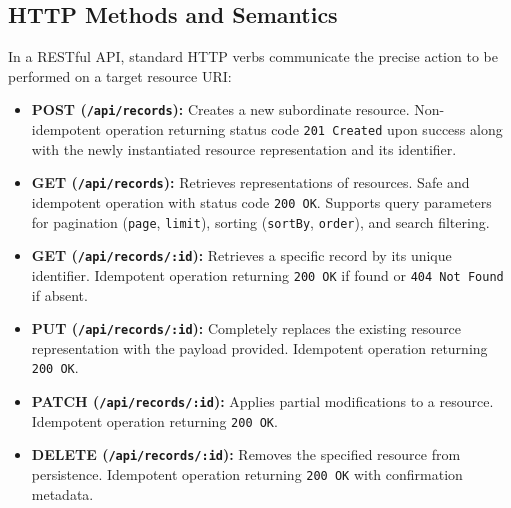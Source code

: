 \documentclass[11pt,a4paper]{article}
\begin{document}
\subsection{HTTP Methods and Semantics}
In a RESTful API, standard HTTP verbs communicate the precise action to be performed on a target resource URI:
\begin{itemize}
    \item \textbf{POST (\texttt{/api/records}):} Creates a new subordinate resource. Non-idempotent operation returning status code \texttt{201 Created} upon success along with the newly instantiated resource representation and its identifier.
    \item \textbf{GET (\texttt{/api/records}):} Retrieves representations of resources. Safe and idempotent operation with status code \texttt{200 OK}. Supports query parameters for pagination (\texttt{page}, \texttt{limit}), sorting (\texttt{sortBy}, \texttt{order}), and search filtering.
    \item \textbf{GET (\texttt{/api/records/:id}):} Retrieves a specific record by its unique identifier. Idempotent operation returning \texttt{200 OK} if found or \texttt{404 Not Found} if absent.
    \item \textbf{PUT (\texttt{/api/records/:id}):} Completely replaces the existing resource representation with the payload provided. Idempotent operation returning \texttt{200 OK}.
    \item \textbf{PATCH (\texttt{/api/records/:id}):} Applies partial modifications to a resource. Idempotent operation returning \texttt{200 OK}.
    \item \textbf{DELETE (\texttt{/api/records/:id}):} Removes the specified resource from persistence. Idempotent operation returning \texttt{200 OK} with confirmation metadata.
\end{itemize}
\end{document}
